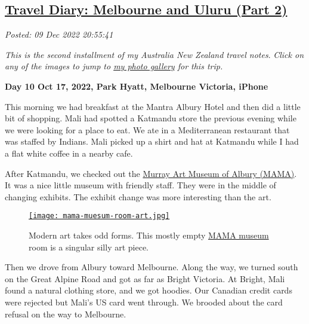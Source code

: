 %

\subsection*{\href{http://analyzethedatanotthedrivel.org/2022/12/09/travel-diary-melbourne-and-uluru-part-2/}{Travel Diary: Melbourne and Uluru (Part 2)}}


\noindent\emph{Posted: 09 Dec 2022 20:55:41}
\vspace{6pt}

\emph{This is the second installment of my Australia New Zealand travel
notes}. \emph{Click on any of the images to jump to
\href{https://conceptcontrol.smugmug.com/Trips/Overseas/Australia-New-Zealand-2022/}{my
photo gallery} for this trip.}


\textbf{Day 10 Oct 17, 2022, Park Hyatt, Melbourne Victoria, iPhone}

This morning we had breakfast at the Mantra Albury Hotel and then did a
little bit of shopping. Mali had spotted a Katmandu store the previous
evening while we were looking for a place to eat. We ate in a Mediterranean 
restaurant that was staffed by Indians. Mali picked up a
shirt and hat at Katmandu while I had a flat white coffee in a nearby
cafe.

After Katmandu, we checked out the
\href{https://www.mamalbury.com.au/}{Murray Art Museum of Albury
(MAMA)}. It was a nice little museum with friendly staff. They were in
the middle of changing exhibits. The exhibit change was more interesting
than the art.

\captionsetup[figure]{labelformat=empty}
\begin{SCfigure}
\centering
\href{https://conceptcontrol.smugmug.com/Trips/Overseas/Australia-New-Zealand-2022/i-Z5hXNjd/A}{\texttt{[image: mama-muesum-room-art.jpg]}}
\caption[MAMA Art museum room]{Modern art takes odd forms. This mostly empty \href{https://www.mamalbury.com.au/}{MAMA museum} room
is a singular silly art piece.}
\label{fig:7573x0}
\end{SCfigure}

Then we drove from Albury toward Melbourne. Along the way, we turned
south on the Great Alpine Road and got as far as Bright Victoria. At
Bright, Mali found a natural clothing store, and we got hoodies. Our
Canadian credit cards were rejected but Mali's US card went through. We
brooded about the card refusal on the way to Melbourne.

